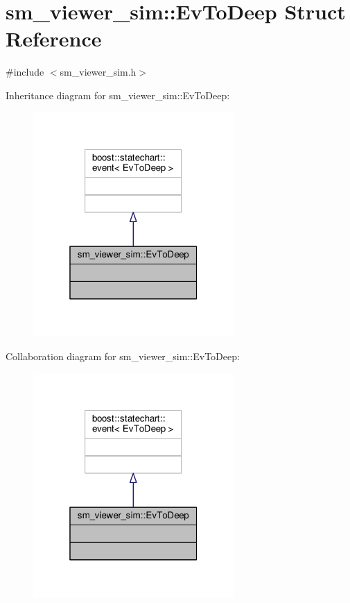 \hypertarget{structsm__viewer__sim_1_1EvToDeep}{}\section{sm\+\_\+viewer\+\_\+sim\+:\+:Ev\+To\+Deep Struct Reference}
\label{structsm__viewer__sim_1_1EvToDeep}


{\ttfamily \#include $<$sm\+\_\+viewer\+\_\+sim.\+h$>$}



Inheritance diagram for sm\+\_\+viewer\+\_\+sim\+:\+:Ev\+To\+Deep\+:
\nopagebreak
\begin{figure}[H]
\begin{center}
\leavevmode
\includegraphics[width=217pt]{structsm__viewer__sim_1_1EvToDeep__inherit__graph}
\end{center}
\end{figure}


Collaboration diagram for sm\+\_\+viewer\+\_\+sim\+:\+:Ev\+To\+Deep\+:
\nopagebreak
\begin{figure}[H]
\begin{center}
\leavevmode
\includegraphics[width=217pt]{structsm__viewer__sim_1_1EvToDeep__coll__graph}
\end{center}
\end{figure}


